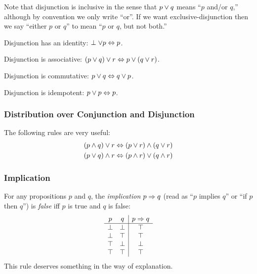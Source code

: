 Note that disjunction is inclusive in the sense that $p \vee q$ means
``$p$ and/or $q$,'' although by convention we only write ``or''.  If we
want exclusive-disjunction then we say ``either $p$ or $q$'' to mean
``$p$ or $q$, but not both.''

Disjunction has an identity: $\perp \vee p \Leftrightarrow p$.

Disjunction is associative: $(p \vee q) \vee r \Leftrightarrow p \vee (q \vee r)$.

Disjunction is commutative: $p \vee q \Leftrightarrow q \vee p$.

Disjunction is idempotent: $p \vee p \Leftrightarrow p$.

\subsubsection{Distribution over Conjunction and Disjunction}

The following rules are very useful:
\begin{align*}
(p \wedge q) \vee r
& \Leftrightarrow (p \vee r) \wedge (q \vee r) \\
(p \vee q) \wedge r
& \Leftrightarrow (p \wedge r) \vee (q \wedge r) \\
\end{align*}

\subsubsection{Implication}

For any propositions $p$ and $q$, the \emph{implication} $p \Rightarrow q$
(read as ``$p$ implies $q$'' or ``if $p$ then $q$'') is \emph{false} iff 
$p$ is true and $q$ is false:
\[
\begin{array}{cc|c}
p       & q       & p \Rightarrow q \\
\hline
\perp  & \perp  & \top \\
\perp  & \top   & \top \\
\top   & \perp  & \perp \\
\top   & \top   & \top \\
\end{array}
\]
This rule deserves something in the way of explanation.

